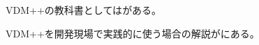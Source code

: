 \documentclass[a4paper,10pt]{jsarticle}
\begin{document}
VDM++の教科書としては\cite{Sakoh2010}がある。

VDM++を開発現場で実践的に使う場合の解説が\cite{Sahara2008}にある。


%

%


\printindex
\end{document}
